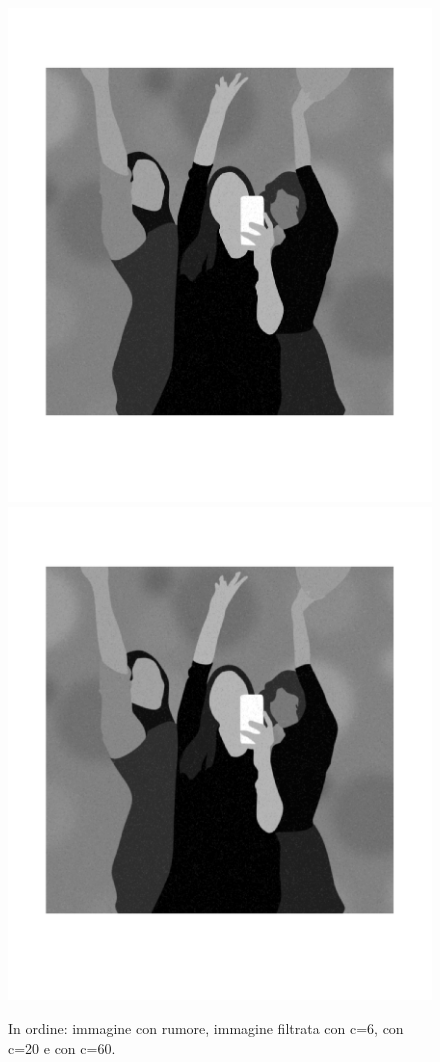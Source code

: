 \begin{figure}[htb]
\includegraphics[scale=0.15,trim={0 5cm 0 3cm},clip]{Pictures/Esempi di utilizzo/Esempio 4/party_filtrata_kappa20.png}
\includegraphics[scale=0.15,trim={0 5cm 0 3cm},clip]{Pictures/Esempi di utilizzo/Esempio 4/party_filtrata_kappa60.png}
\caption{In ordine: immagine con rumore, immagine filtrata con c=6, con c=20 e con c=60.}\label{fig:figura}
\end{figure} 
